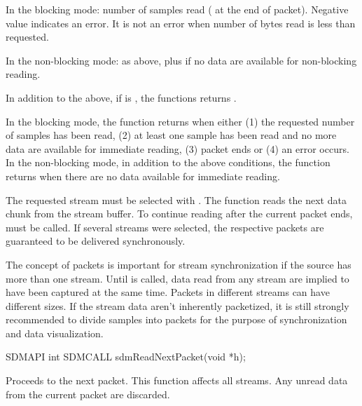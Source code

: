 \documentclass[a4paper,12pt,twoside,extrafontsizes]{memoir}
\begin{document}
\begin{funcret}
	In the blocking mode: number of samples read ( at the end of packet). Negative value indicates an error. It is not an error when number of bytes read is less than requested.
	
	In the non-blocking mode: as above, plus  if no data
	are available for non-blocking reading.
	
	In addition to the above, if  is , the functions returns .
\end{funcret}

\begin{funcremarks}
	In the blocking mode, the function returns when either (1) the requested number of samples has been read, (2) at least one sample has been read and no more data are available for immediate reading, (3) packet ends or (4) an error occurs. In the non-blocking mode, in addition to the above conditions, the function returns when there are no data available for immediate reading.
	
	The requested stream must be selected with . The function reads the next data chunk from the stream buffer. To continue reading after the current packet ends,  must be called. If several streams were selected, the respective packets are guaranteed to be delivered synchronously.
	
	The concept of packets is important for stream synchronization if the source has more than one stream. Until  is called, data read from any stream are implied to have been captured at the same time. Packets in different streams can have different sizes. If the stream data aren't inherently packetized, it is still strongly recommended to divide samples into packets for the purpose of synchronization and data visualization.
\end{funcremarks}



\begin{cfuncprototype}
SDMAPI int SDMCALL sdmReadNextPacket(void *h);
\end{cfuncprototype}

\begin{funcdescr}
	Proceeds to the next packet. This function affects all streams. Any unread data from the current packet are discarded.
\end{funcdescr}
\end{document}

